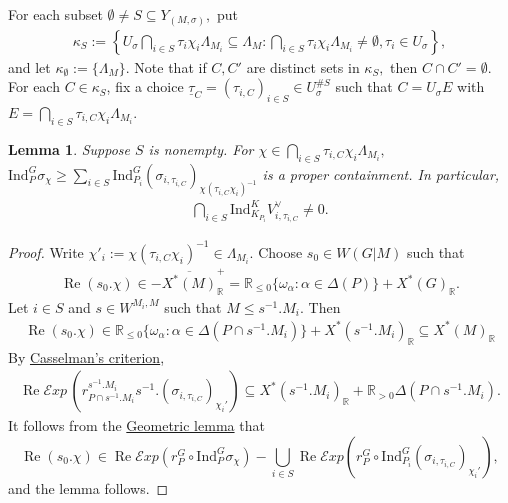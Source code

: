 \documentclass[10pt]{amsart}
\newtheorem{lemma}[theorem]{Lemma}
\theoremstyle{definition}
\numberwithin{equation}{section}
\numberwithin{equation}{subsection}
\newcommand{\Ind}{\mathrm{Ind}}
\newcommand{\RR}{\mathbb{R}}
\renewcommand{\Re}{\mathop{\mathrm{Re}}}
\begin{document}
For each subset $\emptyset\neq   S\subseteq Y_{(M,\sigma)},$ 
put
\begin{align*}
    \kappa_S := \left\{U_\sigma \bigcap_{i\in S} \tau_{i}\chi_i\Lambda_{M_i}\subseteq\Lambda_M: \bigcap_{i\in S} \tau_{i}\chi_i\Lambda_{M_i}\neq \emptyset, \tau_i\in U_\sigma\right\},
\end{align*}
and let $\kappa_\emptyset:=\{\Lambda_M\}$. Note that if $C,C'$ are distinct sets in $\kappa_S,$ then $C\cap C'=\emptyset.$ For each $C\in \kappa_S$, fix a choice $\underline{\tau}_C=(\tau_{i,C})_{i\in S}\in U_\sigma^{\# S}$ such that $C=U_\sigma E$ with $E=\bigcap_{i\in S} \tau_{i,C}\chi_i\Lambda_{M_i}.$ 

\begin{lemma}\label{lem:cuspnonzero}
 Suppose $S$ is nonempty. For $\chi\in \bigcap_{i\in S}\tau_{i,C}\chi_i\Lambda_{M_i},$ $\Ind_P^G \sigma_\chi\ge \sum_{i\in S} \Ind_{P_i}^G (\sigma_{i,\tau_{i,C}})_{\chi(\tau_{i,C}\chi_i)^{-1}}$ is a proper containment. In particular,
\begin{align*}
    \bigcap_{i\in S} \Ind_{K_{P_i}}^K V_{i,\tau_{i,C}}^\vee \neq 0.
\end{align*}
\end{lemma}
\begin{proof} 
Write $\chi'_i:=\chi(\tau_{i,C}\chi_i)^{-1}\in \Lambda_{M_i}.$ Choose $s_0\in W(G|M)$ such that
    \begin{align*}
        \Re(s_0.\chi) \in - \overline{X^\ast(M)}^{+}_\RR =\mathbb{R}_{\leq0}\{\omega_\alpha: \alpha\in\Delta(P)\} + X^*(G)_\RR.
    \end{align*}
    Let $i\in S$ and $s\in W^{M_i,M}$ such that $M\le s^{-1}.M_i$.
    Then
    \begin{align*}
        \Re(s_0.\chi) \in \mathbb{R}_{\leq0}\{\omega_\alpha: \alpha\in\Delta(P\cap s^{-1}.M_i)\} + X^*(s^{-1}.M_i)_\RR \subseteq X^*(M)_\RR
    \end{align*}
    By \hyperref[CasselmanCriterion]{Casselman's criterion},
    \begin{align*}
        \Re\mathcal{E}xp  \,\left(r^{s^{-1}.M_i}_{P\cap s^{-1}.M_i}s^{-1}.(\sigma_{i,\tau_{i,C}})_{\chi_i'}\right)\subseteq X^*(s^{-1}.M_i)_\RR+\RR_{>0}\Delta(P\cap s^{-1}.M_i).
    \end{align*}
    It follows from the \hyperref[geometriclemma:2]{Geometric lemma} that $$\Re (s_0.\chi)\in \Re \mathcal{E}xp \left(r^G_P\circ \mathrm{Ind}_P^G \sigma_\chi\right)-\bigcup_{i\in S} \Re \mathcal{E}xp \left(r^G_P\circ \Ind_{P_i}^G (\sigma_{i,\tau_{i,C}})_{\chi_i'}\right),$$ 
    and the lemma follows.
\end{proof}
\end{document}
